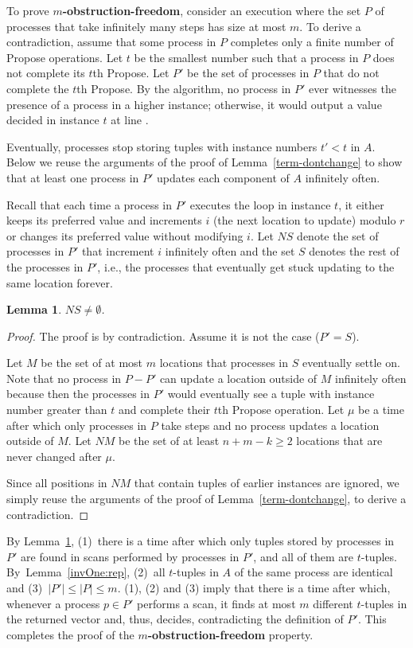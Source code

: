 \documentclass[11pt]{article}
\newtheorem{lemma}[theorem]{Lemma}
\newcounter{linenum}
\newcounter{ind}
\newcommand{\lref}[1]{\linenumref{#1}}
\begin{document}
To prove {\bf $m$-obstruction-freedom}, consider an execution where the set $P$ of 
processes that take infinitely many steps has size at most $m$.
To derive a contradiction, assume that some process in $P$ 
completes only a finite number of {\sc Propose} operations. 
Let $t$ be the smallest number such that a process in $P$ does not complete its $t$th {\sc Propose}.
Let $P'$ be the set of processes in $P$ that do not complete the $t$th {\sc Propose}.
By the algorithm, no process in $P'$ ever witnesses the presence of a
process in a higher instance; otherwise, it would output a value
decided in instance $t$ at line \lref{halt-rep}.
  
Eventually, processes stop storing tuples with instance numbers
$t'<t$ in $A$.  Below we reuse the arguments of the proof of
Lemma~\ref{term-dontchange} to show that at least one process in $P'$
updates each component of $A$ infinitely often.

Recall that each time a process in $P'$ executes the loop in
instance $t$, it either keeps its preferred value and increments $i$ (the next location to
update) modulo $r$ or changes its preferred value without modifying  $i$. 
Let  $NS$ denote the set of processes in $P'$ that  increment $i$ infinitely often and
the set $S$ denotes the rest of the processes in $P'$, 
i.e., the processes that eventually get stuck
updating to the same location forever.


\begin{lemma}\label{term-dontchange:rep}
$NS\neq \emptyset$.
\end{lemma}
\begin{proof}
The proof is by contradiction.
Assume it is not the case ($P'=S$).

Let $M$ be the set of at most $m$ locations that processes in $S$ eventually settle on.
Note that no process in $P-P'$ can update a location outside of $M$ infinitely often
because then the processes in $P'$ would eventually see a tuple with instance number greater
than $t$ and complete their $t$th {\sc Propose} operation.
Let $\mu$ be a time after which
only processes in $P$ take steps and 
no process updates a location outside of $M$.
Let $NM$ be the set of at least $n+m-k\ge 2$ locations that are never changed after $\mu$.

Since all positions in $NM$ that contain tuples of earlier instances
are ignored, we simply reuse the arguments of the proof of
Lemma~\ref{term-dontchange}, to derive a contradiction.
\end{proof}
By Lemma~\ref{term-dontchange:rep}, (1)~there is a time after which only tuples stored
by processes in $P'$ are found in scans performed by processes in $P'$, 
and all of them are $t$-tuples.
By~Lemma~\ref{invOne:rep}, (2)~all $t$-tuples in $A$ of the same process are identical
and (3)~$|P'|\leq|P|\leq m$. (1), (2) and (3) imply that there is a time after which,  whenever a process $p\in P'$ performs a scan, 
it finds at most $m$ different $t$-tuples in the returned vector and,
thus, decides, contradicting the definition of $P'$.  This completes the proof of the {\bf $m$-obstruction-freedom} property. 
\end{document}
